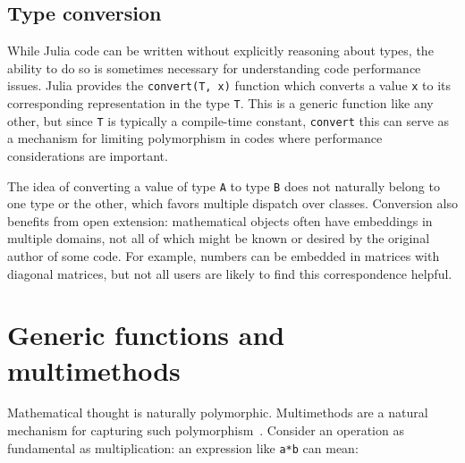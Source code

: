 \documentclass[10pt, preprint]{sigplanconf}
\begin{document}
\subsection{Type conversion}

While Julia code can be written without
explicitly reasoning about types, the ability to do so is sometimes necessary for
understanding code performance issues. Julia provides the \verb|convert(T, x)|
function which converts a value \verb|x| to its corresponding representation in
the type \verb|T|. This is a generic function like any other, but since
\verb|T| is typically a compile-time constant, \verb|convert| this can serve
as a mechanism for limiting polymorphism in codes where performance
considerations are important.

The idea of converting a value of type \verb|A| to type \verb|B|
does not naturally belong to one type or the other, which favors multiple
dispatch over classes. Conversion also benefits from open extension:
mathematical objects often have embeddings in multiple domains, not all of
which might be known or desired by the original author of some code. For
example, numbers can be embedded in matrices with diagonal matrices, but not
all users are likely to find this correspondence helpful.


\section{Generic functions and multimethods}

Mathematical thought is
naturally polymorphic. Multimethods are a natural mechanism for capturing such
polymorphism~\cite{Bezanson2014b,Chen2014}. Consider an operation as
fundamental as multiplication: an expression like \verb|a*b| can mean:
\end{document}
